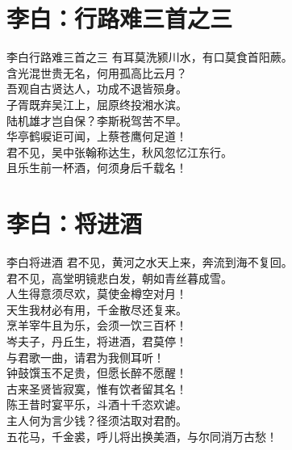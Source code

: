 \documentclass[12pt,oneside,a5paper]{book}
\begin{document}
\chapter{李白：行路难三首之三}
\begin{poemzh}{李白}{行路难三首之三}
有耳莫洗颍川水，有口莫食首阳蕨。\\
含光混世贵无名，何用孤高比云月？\\
吾观自古贤达人，功成不退皆殒身。\\
子胥既弃吴江上，屈原终投湘水滨。\\
陆机雄才岂自保？李斯税驾苦不早。\\
华亭鹤唳讵可闻，上蔡苍鹰何足道！\\
君不见，吴中张翰称达生，秋风忽忆江东行。\\
且乐生前一杯酒，何须身后千载名！\\ 
\end{poemzh}


\chapter{李白：将进酒}
\begin{poemzh}{李白}{将进酒}
君不见，黄河之水天上来，奔流到海不复回。\\
君不见，高堂明镜悲白发，朝如青丝暮成雪。\\
人生得意须尽欢，莫使金樽空对月！\\
天生我材必有用，千金散尽还复来。\\
烹羊宰牛且为乐，会须一饮三百杯！\\
岑夫子，丹丘生，将进酒，君莫停！\\
与君歌一曲，请君为我侧耳听！\\
钟鼓馔玉不足贵，但愿长醉不愿醒！\\
古来圣贤皆寂寞，惟有饮者留其名！\\
陈王昔时宴平乐，斗酒十千恣欢谑。\\
主人何为言少钱？径须沽取对君酌。\\
五花马，千金裘，呼儿将出换美酒，与尔同消万古愁！\\ 
\end{poemzh}
\end{document}
